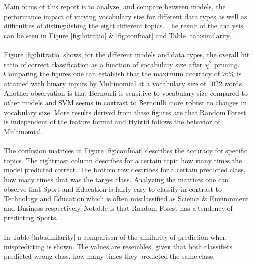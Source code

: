 Main focus of this report is to analyze, and compare between models, the performance impact of varying vocabulary size for different data types as well as difficulties of distinguishing the eight different topics. The result of the analysis can be seen in Figure \ref{fig:hitratio} \& \ref{fig:confmat} and Table \ref{tab:similarity}.\\\\
Figure \ref{fig:hitratio} shows, for the different models and data types, the overall hit ratio of correct classification as a function of vocabulary size after $\chi^2$ pruning. Comparing the figures one can establish that the maximum accuracy of 76\% is attained with binary inputs by Multinomial at a vocabulary size of 1022 words. Another observation is that Bernoulli is sensitive to vocabulary size compared to other models and SVM seems in contrast to Bernoulli more robust to changes in vocabulary size. More results derived from these figures are that Random Forest is independent of the feature format and Hybrid follows the behavior of Multinomial.\\\\
The confusion matrices in Figure \ref{fig:confmat} describes the accuracy for specific topics. The rightmost column describes for a certain topic how many times the model predicted correct. The bottom row describes for a certain predicted class, how many times that was the target class. Analyzing the matrices one can observe that Sport and Education is fairly easy to classify in contrast to Technology and Education which is often misclassified as Science \& Environment and Business respectively. Notable is that Random Forest has a tendency of predicting Sports.\\\\
In Table \ref{tab:similarity} a comparison of the similarity of prediction when mispredicting is shown. The values are resembles, given that both classifiers predicted wrong class, how many times they predicted the same class.

\onecolumn

\onecolumn

\twocolumn
